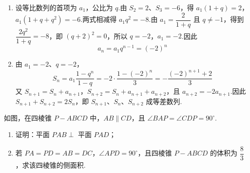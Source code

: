 \begin{solution}
\begin{enumerate}
\item 设等比数列的首项为 \(a_1\)，公比为 \(q\).由 \(S_2=2\)、\(S_3=-6\)，得 \(a_1(1+q)=2\)，\(a_1(1+q+q^2)=-6\).两式相减得 \(a_1q^2=-8\).由 \(a_1=\dfrac{2}{1+q}\) 且 \(q\ne-1\)，得到 \(\dfrac{2q^2}{1+q}=-8\)，即 \((q+2)^2=0\)，所以 \(q=-2\)，\(a_1=-2\).因此
\[
a_n=a_1q^{n-1}=(-2)^n
\]
\item 由 \(a_1=-2\)、\(q=-2\)，
\[
S_n=a_1\frac{1-q^n}{1-q}=-2\cdot\frac{1-(-2)^n}{3}
=-\frac{(-2)^{n+1}+2}{3}
\]
又 \(S_{n+1}=S_n+a_{n+1}\)，\(S_{n+2}=S_n+a_{n+1}+a_{n+2}\)，且 \(a_{n+2}=-2a_{n+1}\).因此 \(S_{n+1}+S_{n+2}=2S_n\)，即 \(S_{n+1}\)、\(S_n\)、\(S_{n+2}\) 成等差数列.
\end{enumerate}
\end{solution}


\begin{problem}
如图，在四棱锥 \(P-ABCD\) 中，\(AB\parallel CD\)，且 \(\angle BAP=\angle CDP=90^\circ\).

\begin{enumerate}
\item 证明：平面 \(PAB\perp\) 平面 \(PAD\)；
\item 若 \(PA=PD=AB=DC\)，\(\angle APD=90^\circ\)，且四棱锥 \(P-ABCD\) 的体积为 \( \dfrac{8}{3}\)，求该四棱锥的侧面积.
\end{enumerate}

\end{problem}

